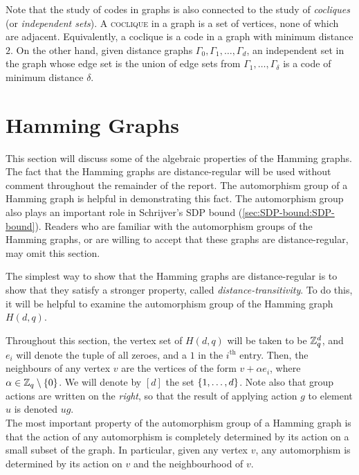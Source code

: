 \documentclass{report}
\begin{document}
    Note that the study of codes in graphs is also connected to the study of
    \textit{cocliques} (or \textit{independent sets}).  A \textsc{coclique} in a
    graph is a set of vertices, none of which are adjacent.  Equivalently, a
    coclique is a code in a graph with minimum distance $2$.  On the other hand,
    given distance graphs $\Gamma_0, \Gamma_1, \ldots, \Gamma_d$, 
    an independent set in the graph whose edge set is the union of edge sets
    from $\Gamma_1, \ldots, \Gamma_\delta$ is a code of minimum distance
    $\delta$.

  \section{Hamming Graphs}\label{sec:intro:hamming}

    This section will discuss some of the algebraic properties of the Hamming
    graphs.  The fact that the Hamming graphs are distance-regular will be used
    without comment throughout the remainder of the report.  The automorphism
    group of a Hamming graph is helpful in demonstrating this fact.  The
    automorphism group also plays an important role in Schrijver's SDP bound
    (\ref{sec:SDP-bound:SDP-bound}).  Readers who are familiar with the
    automorphism groups of the Hamming graphs, or are willing to accept that
    these graphs are distance-regular, may omit this section.  

    The simplest way to show that the Hamming graphs are distance-regular is to
    show that they satisfy a stronger property, called
    \textit{distance-transitivity}.  To do this, it will be helpful to examine
    the automorphism group of the Hamming graph $H(d, q)$.

    Throughout this section, the vertex set of $H(d, q)$ will be taken to be
    $\mathbb{Z}_q^d$, and $e_i$ will denote the tuple of all zeroes, and a $1$ in the
    $i^\text{th}$ entry.  Then, the neighbours of any vertex $v$ are the
    vertices of the form $v + \alpha e_i$, where $\alpha \in \mathbb{Z}_q \setminus
    \left\lbrace 0 \right\rbrace$.  We will denote by $[d]$ the set $\left\lbrace 1, \ldots, d \right\rbrace$.  Note also
    that group actions are written on the \textit{right}, so that the result of
    applying action $g$ to element $u$ is denoted $ug$.
    \\

    The most important property of the automorphism group of a Hamming graph is
    that the action of any automorphism is completely determined by its action
    on a small subset of the graph.  In particular, given any vertex $v$, any
    automorphism is determined by its action on $v$ and the neighbourhood of
    $v$.  
\end{document}
